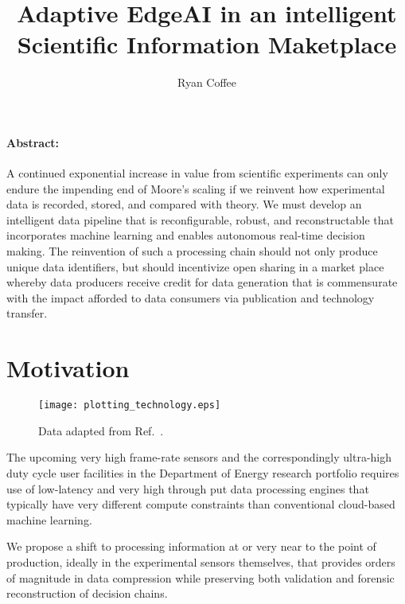 \documentclass{article}
\title{Adaptive EdgeAI in an intelligent Scientific Information Maketplace}
\author{Ryan Coffee}
\begin{document}
\maketitle

\paragraph{Abstract:} %
A continued exponential increase in value from scientific experiments can only endure the impending end of Moore's scaling if we reinvent how experimental data is recorded, stored, and compared with theory.
We must develop an intelligent data pipeline that is reconfigurable, robust, and reconstructable that incorporates machine learning and enables autonomous real-time decision making.
The reinvention of such a processing chain should not only produce unique data identifiers, but should incentivize open sharing in a market place whereby data producers receive credit for data generation that is commensurate with the impact afforded to data consumers via publication and technology transfer.

\section{Motivation}
\begin{wrapfigure}[33]{r}{.5\linewidth}
	\centerline{ \texttt{[image: plotting\_technology.eps]} }
	\caption{
		\label{fig::technology} 
		Data adapted from Ref.~\cite{MicroprocessorTrendData}. 
	}
\end{wrapfigure}

The upcoming very high frame-rate sensors and the correspondingly ultra-high duty cycle user facilities in the Department of Energy research portfolio requires use of low-latency and very high through put data processing engines that typically have very different compute constraints than conventional cloud-based machine learning.

We propose a shift to processing information at or very near to the point of production, ideally in the experimental sensors themselves, that provides orders of magnitude in data compression while preserving both validation and forensic reconstruction of decision chains.
\end{document}
